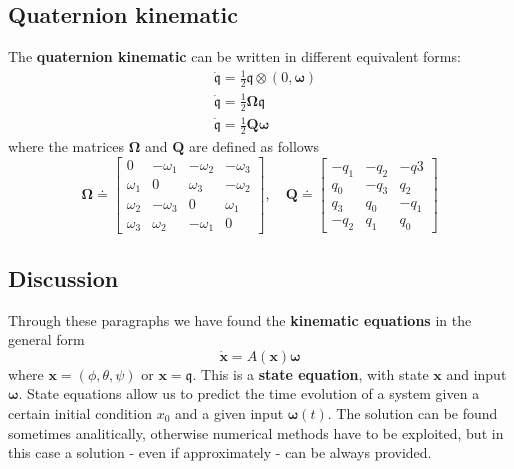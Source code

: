\subsection{Quaternion kinematic}
The \textbf{quaternion kinematic} can be written in different equivalent forms:
\begin{align}
    &\dot{\mathfrak{q}}=\frac{1}{2}\mathfrak{q}\otimes(0,\boldsymbol{\omega})\\
    &\dot{\mathfrak{q}}=\frac{1}{2}\boldsymbol{\Omega}\mathfrak{q}\\
    &\dot{\mathfrak{q}}=\frac{1}{2}\mathbf{Q}\boldsymbol{\omega}
\end{align}
where the matrices $\boldsymbol{\Omega}$ and $\mathbf{Q}$ are defined as follows
\begin{equation*}
    \boldsymbol{\Omega}\doteq\begin{bmatrix}
        0&-\omega_1&-\omega_2&-\omega_3\\
        \omega_1&0&\omega_3&-\omega_2\\
        \omega_2&-\omega_3&0&\omega_1\\
        \omega_3&\omega_2&-\omega_1&0
    \end{bmatrix}, \quad 
    \mathbf{Q}\doteq \begin{bmatrix}
        -q_1&-q_2&-q3\\
        q_0&-q_3&q_2\\
        q_3&q_0&-q_1\\
        -q_2&q_1&q_0
    \end{bmatrix}
\end{equation*} 

\subsection{Discussion}
Through these paragraphs we have found the \textbf{kinematic equations} in the general form
{\large{
    \begin{equation}
        \dot{\mathbf{x}} = A(\mathbf{x})\boldsymbol{\omega}
    \end{equation}
}}
where $\mathbf{x}=(\phi, \theta, \psi)$ or $\mathbf{x}=\mathfrak{q}$. This is a \textbf{state equation}, with state $\mathbf{x}$ and input $\boldsymbol{\omega}$. State equations allow us to predict the time evolution of a system given a certain initial condition $x_0$ and a given input $\boldsymbol{\omega}(t)$. The solution can be found sometimes analitically, otherwise numerical methods have to be exploited, but in this case a solution - even if approximately - can be always provided.

